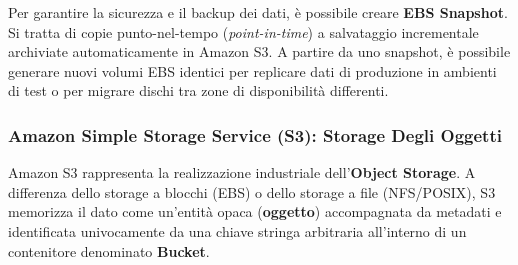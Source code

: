 \documentclass[11pt, a4paper]{article}
\begin{document}

Per garantire la sicurezza e il backup dei dati, è possibile creare \textbf{EBS Snapshot}. Si tratta di copie punto-nel-tempo (\emph{point-in-time}) a salvataggio incrementale archiviate automaticamente in Amazon S3. A partire da uno snapshot, è possibile generare nuovi volumi EBS identici per replicare dati di produzione in ambienti di test o per migrare dischi tra zone di disponibilità differenti.

\subsubsection{Amazon Simple Storage Service (S3): Storage Degli Oggetti}
Amazon S3 rappresenta la realizzazione industriale dell'\textbf{Object Storage}. A differenza dello storage a blocchi (EBS) o dello storage a file (NFS/POSIX), S3 memorizza il dato come un'entità opaca (\textbf{oggetto}) accompagnata da metadati e identificata univocamente da una chiave stringa arbitraria all'interno di un contenitore denominato \textbf{Bucket}.
\end{document}
